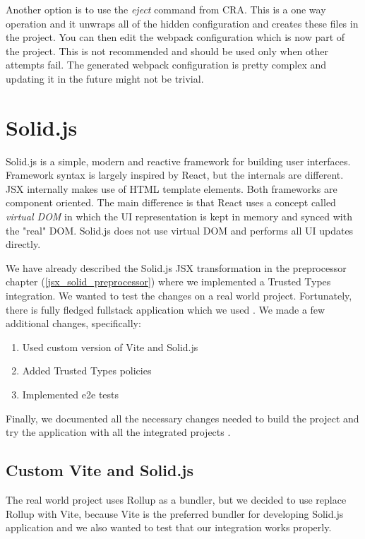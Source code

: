 Another option is to use the \textit{eject} command from CRA. This is a one way operation and it
unwraps all of the hidden configuration and creates these files in the project. You can then edit
the webpack configuration which is now part of the project. This is not recommended and should be
used only when other attempts fail. The generated webpack configuration is pretty complex and
updating it in the future might not be trivial.

\section{Solid.js}
\label{section:solid}

Solid.js is a simple, modern and reactive framework for building user interfaces. Framework
syntax is largely inspired by React, but the internals are different. JSX internally makes use of
HTML template elements. Both frameworks are component oriented. The main difference is that React
uses a concept called \emph{virtual DOM} in which the UI representation is kept in memory and synced
with the "real" DOM. Solid.js does not use virtual DOM and performs all UI updates directly.

We have already described the Solid.js JSX transformation in the preprocessor chapter
(\ref{jsx_solid_preprocessor}) where we implemented a Trusted Types integration. We wanted to test
the changes on a real world project. Fortunately, there is fully fledged fullstack application which
we used \cite{original_solid_realworld_project}. We made a few additional changes, specifically:

\begin{enumerate}
  \item Used custom version of Vite and Solid.js
  \item Added Trusted Types policies
  \item Implemented e2e tests
\end{enumerate}

Finally, we documented all the necessary changes needed to build the project and try the application
with all the integrated projects \cite{solid_realworld_project:readme}.

\subsection{Custom Vite and Solid.js}

The real world project uses Rollup as a bundler, but we decided to use replace Rollup with Vite,
because Vite is the preferred bundler for developing Solid.js application and we also wanted to test
that our integration works properly.

